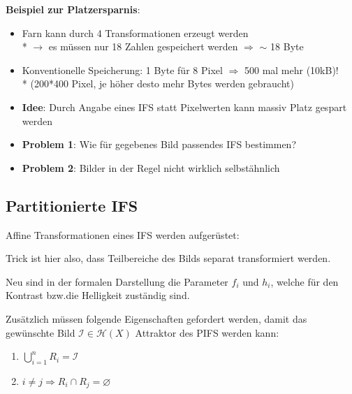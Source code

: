 \documentclass[afourpaper]{latex-classes/handout}
\renewcommand{\emph}[1]{\textcolor{kitGreen}{#1}}
\begin{document}
\begin{marginfigure}[10em]
  \textbf{Beispiel zur Platzersparnis}: \\
  \begin{itemize}
    \item Farn kann durch 4 Transformationen erzeugt werden \\*
      \( \to \) es müssen nur 18 Zahlen gespeichert werden \( \Rightarrow \) \emph{\( \sim \) 18 Byte}
    \item Konventionelle Speicherung: 1 Byte für 8 Pixel \( \Rightarrow \) \emph{500 mal mehr} (10kB)! \\*
    (200*400 Pixel, je höher desto mehr Bytes werden gebraucht)
  \end{itemize}
\end{marginfigure}

\begin{itemize}
  \item \textbf{Idee}: Durch Angabe eines IFS statt Pixelwerten kann massiv Platz gespart werden
  \item \textbf{Problem 1}: Wie für gegebenes Bild passendes IFS bestimmen?
  \item \textbf{Problem 2}: Bilder in der Regel nicht wirklich selbstähnlich
\end{itemize}

\subsection{Partitionierte IFS}

Affine Transformationen eines IFS werden aufgerüstet:

\begin{marginfigure}[10em]
  Trick ist hier also, dass Teilbereiche des Bilds separat transformiert werden.

  Neu sind in der formalen Darstellung die Parameter \( f_i \) und \( h_i \), welche für den Kontrast bzw.\@ die Helligkeit zuständig sind.

  Zusätzlich müssen folgende Eigenschaften gefordert werden, damit das gewünschte Bild \( \mathcal{I} \in \mathcal{H}(X) \) Attraktor des PIFS werden kann:
  \begin{enumerate}
    \item \( \bigcup_{i=1}^n R_i = \mathcal{I} \)
    \item \( i \neq j \Rightarrow R_i \cap R_j = \varnothing \)
  \end{enumerate}
\end{marginfigure}
\end{document}
